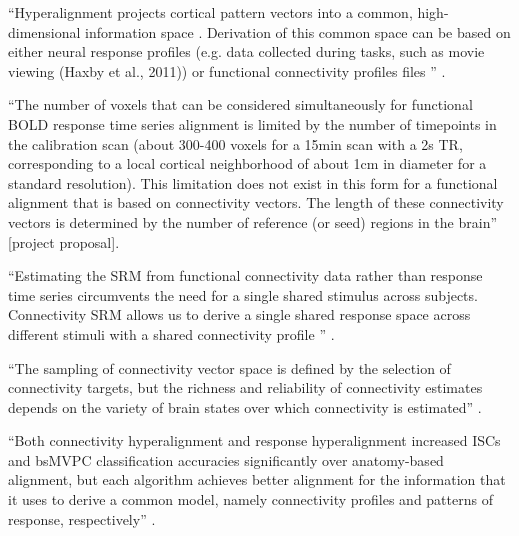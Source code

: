 




``Hyperalignment projects cortical pattern vectors into a common,
high-dimensional information space \citep{haxby2020hyperalignment}.
%
Derivation of this common space can be based on either neural response profiles
(e.g. data collected during tasks, such as movie viewing (Haxby et al., 2011))
or functional connectivity profiles files \citep{guntupalli2018computational}''
\citep{busch2021hybrid}.

``The number of voxels that can be considered simultaneously for functional BOLD
response time series alignment is limited by the number of timepoints in the
calibration scan (about 300-400 voxels for a 15min scan with a 2s TR,
corresponding to a local cortical neighborhood of about 1cm in diameter for a
standard resolution).
%
This limitation does not exist in this form for a functional alignment that is
based on connectivity vectors.
%
The length of these connectivity vectors is determined by the number of
reference (or seed) regions in the brain'' [project proposal].

``Estimating the SRM from functional connectivity data rather than response time
series circumvents the need for a single shared stimulus across subjects.
%
Connectivity SRM allows us to derive a single shared response space across
different stimuli with a shared connectivity profile
\citep{nastase2019leveraging}'' \citep{kumar2020brainiak}.

%
``The sampling of connectivity vector space is defined by the selection of
connectivity targets, but the richness and reliability of connectivity estimates
depends on the variety of brain states over which connectivity is estimated''
\citep{haxby2020hyperalignment}.

%
``Both connectivity hyperalignment and response hyperalignment increased ISCs
and bsMVPC classification accuracies significantly over anatomy-based alignment,
but each algorithm achieves better alignment for the information that it uses to
derive a common model, namely connectivity profiles and patterns of response,
respectively'' \citep{guntupalli2018computational}.


